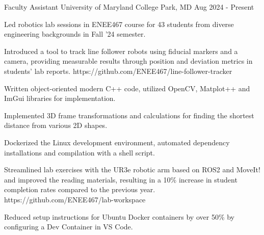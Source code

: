 \begin{work}
  {Faculty Assistant}
  {University of Maryland}
  {College Park, MD}
  {Aug 2024 - Present}

  \item Led robotics lab sessions in ENEE467 course for 43 students from diverse engineering
        backgrounds in Fall '24 semester.

  \item {} {Introduced a tool to
        track line follower robots using fiducial markers and a camera, providing measurable
        results through position and deviation metrics in students' lab reports.}
        {https://github.com/ENEE467/line-follower-tracker}

        \begin{workdetail-list}

        \item Written object-oriented modern C++ code, utilized OpenCV, Matplot++ and ImGui
              libraries for implementation.

        \item Implemented 3D frame transformations and calculations for finding the shortest
              distance from various 2D shapes.


        \item Dockerized the Linux development environment, automated dependency installations and
              compilation with a shell script.

        \end{workdetail-list}

  \item {} {Streamlined lab exercises with the UR3e robotic arm
        based on ROS2 and MoveIt! and improved the reading materials, resulting in a 10\% increase in
        student completion rates compared to the previous year.}
        {https://github.com/ENEE467/lab-workspace}

        \begin{workdetail-list}

        \item Reduced setup instructions for Ubuntu Docker containers by over 50\% by configuring a
              Dev Container in VS Code.


\end{workdetail-list}
\end{work}
